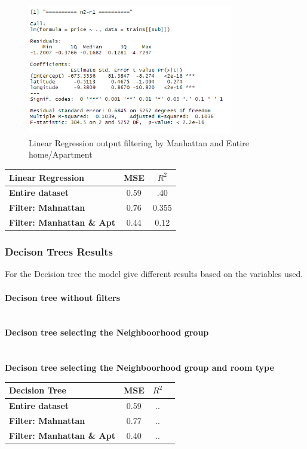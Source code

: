\documentclass{FR16}
\begin{document}
\begin{figure}[H]
\centering
\includegraphics[width=0.8\textwidth]{figures/lm10.PNG} 
\caption{\label{fig:7}  Linear Regression output filtering by  Manhattan and Entire home/Apartment }
\end{figure}



\begin{center}
\begin{tabular}{l  c c }
\arrayrulecolor{Azzurro}
\hline
{\bfseries Linear Regression
} & MSE & $R^2$  \\
\hline
{\bfseries Entire dataset} & 0.59 & .40  \\
{\bfseries Filter: Mahnattan} & 0.76 & 0.355  \\
{\bfseries Filter: Manhattan \& Apt} & 0.44 &  0.12  \\
\hline
\end{tabular}
\end{center}


\subsubsection{Decison Trees Results}
For the Decision tree the model give different results based on the variables used.
\\\\ \textbf{Decison tree  without filters}\\
\\\\
\textbf{Decison tree selecting the Neighboorhood group}\\
\\\\ 
\textbf{Decison tree  selecting the Neighboorhood group and room type}



\begin{center}
\begin{tabular}{l c c c }
\arrayrulecolor{Azzurro}
\hline
{\bfseries Decision Tree
} & MSE & $R^2$  \\
\hline
{\bfseries Entire dataset} & 0.59 & ..  \\
{\bfseries Filter: Mahnattan} & 0.77 & ..  \\
{\bfseries Filter: Manhattan \& Apt} &  0.40 & ..  \\
\hline
\end{tabular}
\end{center}
\end{document}
